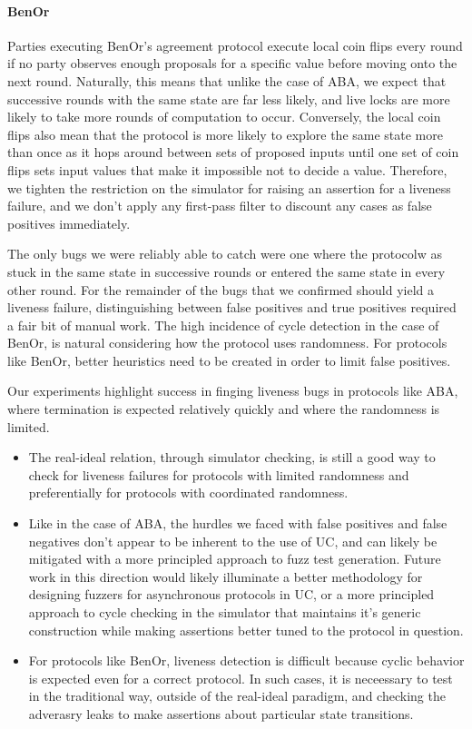 \paragraph{BenOr}
Parties executing BenOr's agreement protocol execute local coin flips every round if no party observes enough proposals for a specific value before moving onto the next round.
Naturally, this means that unlike the case of ABA, we expect that successive rounds with the same state are far less likely, and live locks are more likely to take more rounds of computation to occur. 
Conversely, the local coin flips also mean that the protocol is more likely to explore the same state more than once as it hops around between sets of proposed inputs until one set of coin flips sets input values that make it impossible not to decide a value.
Therefore, we tighten the restriction on the simulator for raising an assertion for a liveness failure, and we don't apply any first-pass filter to discount any cases as false positives immediately. 

The only bugs we were reliably able to catch were one where the protocolw as stuck in the same state in successive rounds or entered the same state in every other round.
For the remainder of the bugs that we confirmed should yield a liveness failure, distinguishing between false positives and true positives required a fair bit of manual work.
The high incidence of cycle detection in the case of BenOr, is natural considering how the protocol uses randomness.
For protocols like BenOr, better heuristics need to be created in order to limit false positives.

Our experiments highlight success in finging liveness bugs in protocols like ABA, where termination is expected relatively quickly and where the randomness is limited.
\begin{itemize}
\item The real-ideal relation, through simulator checking, is still a good way to check for liveness failures for protocols with limited randomness and preferentially for protocols with coordinated randomness.
\item Like in the case of ABA, the hurdles we faced with false positives and false negatives don't appear to be inherent to the use of UC, and can likely be mitigated with a more principled approach to fuzz test generation. Future work in this direction would likely illuminate a better methodology for designing fuzzers for asynchronous protocols in UC, or a more principled approach to cycle checking in the simulator that maintains it's generic construction while making assertions better tuned to the protocol in question.
\item For protocols like BenOr, liveness detection is difficult because cyclic behavior is expected even for a correct protocol. In such cases, it is neceessary to test in the traditional way, outside of the real-ideal paradigm, and checking the adverasry leaks to make assertions about particular state transitions.
\end{itemize}

